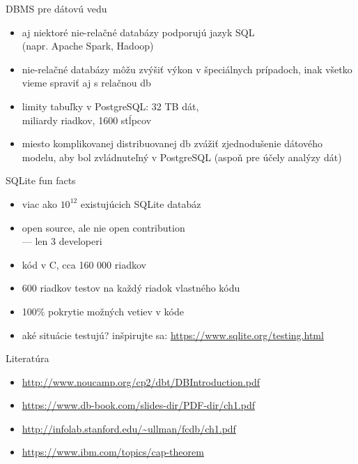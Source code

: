 \documentclass[12pt]{beamer}
\begin{document}
\begin{frame}{DBMS pre dátovú vedu}
\begin{itemize}
\item aj niektoré nie-relačné databázy podporujú jazyk SQL\\
    (napr. Apache Spark, Hadoop)
\item nie-relačné databázy môžu zvýšiť výkon v špeciálnych prípadoch, inak všetko vieme spraviť aj s relačnou db
\item limity tabuľky v PostgreSQL: 32 TB dát,\\ miliardy riadkov, 1600 stĺpcov
\item miesto komplikovanej distribuovanej db zvážiť zjednodušenie dátového modelu, aby bol zvládnuteľný v PostgreSQL (aspoň pre účely analýzy dát)
\end{itemize}
\end{frame}

\begin{frame}{SQLite fun facts}
\begin{itemize}
\item viac ako $10^{12}$ existujúcich SQLite databáz
\item open source, ale nie open contribution\\ --- len 3 developeri
\item kód v C, cca 160 000 riadkov
\item 600 riadkov testov na každý riadok vlastného kódu
\item 100\% pokrytie možných vetiev v kóde
\item aké situácie testujú? inšpirujte sa: \url{https://www.sqlite.org/testing.html}
\end{itemize}
\end{frame}


\begin{frame}{Literatúra}
\begin{itemize}
\item {\scriptsize\url{http://www.noucamp.org/cp2/dbt/DBIntroduction.pdf}}
\item {\scriptsize\url{https://www.db-book.com/slides-dir/PDF-dir/ch1.pdf}}
\item {\scriptsize\url{http://infolab.stanford.edu/~ullman/fcdb/ch1.pdf}}
\item {\scriptsize\url{https://www.ibm.com/topics/cap-theorem}}
\end{itemize}
\end{frame}
\end{document}

